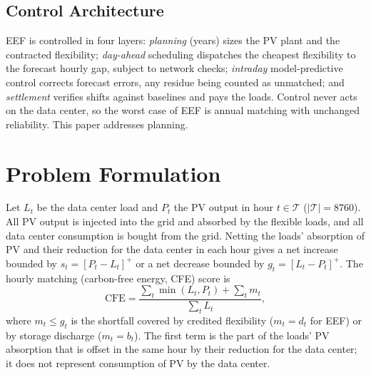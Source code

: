 \documentclass[conference]{IEEEtran}
\begin{document}
\subsection{Control Architecture}
EEF is controlled in four layers: \emph{planning} (years) sizes the PV plant and the contracted flexibility; \emph{day-ahead} scheduling dispatches the cheapest flexibility to the forecast hourly gap, subject to network checks; \emph{intraday} model-predictive control corrects forecast errors, any residue being counted as unmatched; and \emph{settlement} verifies shifts against baselines and pays the loads. Control never acts on the data center, so the worst case of EEF is annual matching with unchanged reliability. This paper addresses planning.

\section{Problem Formulation}
Let $L_t$ be the data center load and $P_t$ the PV output in hour $t \in \mathcal{T}$ ($|\mathcal{T}|=8760$). All PV output is injected into the grid and absorbed by the flexible loads, and all data center consumption is bought from the grid. Netting the loads' absorption of PV and their reduction for the data center in each hour gives a net increase bounded by $s_t=[P_t-L_t]^+$ or a net decrease bounded by $g_t=[L_t-P_t]^+$. The hourly matching (carbon-free energy, CFE) score is
\begin{equation}
\mathrm{CFE}=\frac{\sum_t \min(L_t,P_t)+\sum_t m_t}{\sum_t L_t},
\label{eq:cfe}
\end{equation}
where $m_t \le g_t$ is the shortfall covered by credited flexibility ($m_t=d_t$ for EEF) or by storage discharge ($m_t=b_t$). The first term is the part of the loads' PV absorption that is offset in the same hour by their reduction for the data center; it does not represent consumption of PV by the data center.
\end{document}
